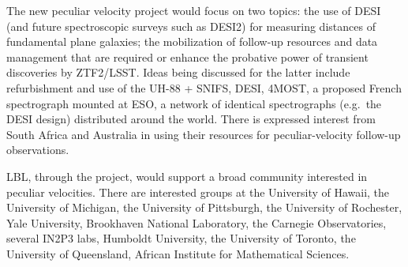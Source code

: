 The new peculiar velocity project would focus on two topics: the use of DESI (and future spectroscopic surveys
such as DESI2) for measuring distances of
fundamental plane galaxies; the mobilization of follow-up resources and data management that are required or enhance 
the probative power of transient discoveries by ZTF2/LSST.  Ideas being discussed for the latter include
refurbishment and use of the
UH-88 + SNIFS, DESI, 4MOST, a proposed French spectrograph mounted at ESO,
a network of identical spectrographs (e.g.\ the DESI design) distributed around the world.
There is expressed interest from South Africa and Australia in using their resources for peculiar-velocity follow-up observations.

LBL, through the project, would support a broad community interested in peculiar velocities. 
There are interested groups at the  University of Hawaii, the University of Michigan, the University of Pittsburgh, the University of Rochester, Yale University,  Brookhaven National Laboratory,
the Carnegie Observatories, several IN2P3 labs, Humboldt University, the University of Toronto,  the University of Queensland, African Institute for Mathematical
Sciences.